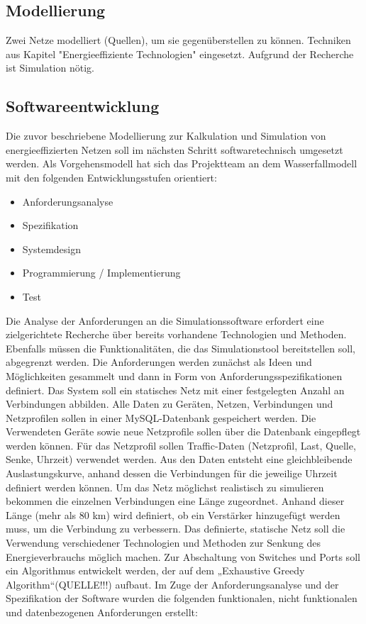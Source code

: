 \documentclass[12pt,titlepage]{article}
\begin{document}
\subsection{Modellierung}
Zwei Netze modelliert (Quellen), um sie gegenüberstellen zu können. Techniken aus Kapitel "Energieeffiziente Technologien" eingesetzt.
Aufgrund der Recherche ist Simulation nötig.

\subsection{Softwareentwicklung}
Die zuvor beschriebene Modellierung zur Kalkulation und Simulation von energieeffizierten Netzen soll im nächsten Schritt softwaretechnisch umgesetzt werden. Als Vorgehensmodell hat sich das Projektteam an dem Wasserfallmodell mit den folgenden Entwicklungsstufen orientiert:
\begin{itemize}
\item Anforderungsanalyse
\item Spezifikation
\item Systemdesign
\item Programmierung / Implementierung
\item Test
\end{itemize}
Die Analyse der Anforderungen an die Simulationssoftware erfordert eine zielgerichtete Recherche über bereits vorhandene Technologien und Methoden. Ebenfalls müssen die Funktionalitäten, die das Simulationstool bereitstellen soll, abgegrenzt werden. Die Anforderungen werden zunächst als Ideen und Möglichkeiten gesammelt und dann in Form von Anforderungsspezifikationen definiert. 
Das System soll ein statisches Netz mit einer festgelegten Anzahl an Verbindungen abbilden. Alle Daten zu Geräten, Netzen, Verbindungen und Netzprofilen sollen in einer MySQL-Datenbank gespeichert werden. Die Verwendeten Geräte sowie neue Netzprofile sollen über die Datenbank eingepflegt werden können. Für das Netzprofil sollen Traffic-Daten (Netzprofil, Last, Quelle, Senke, Uhrzeit) verwendet werden. Aus den Daten entsteht eine gleichbleibende Auslastungskurve, anhand dessen die Verbindungen für die jeweilige Uhrzeit definiert werden können. Um das Netz möglichst realistisch zu simulieren bekommen die einzelnen Verbindungen eine Länge zugeordnet. Anhand dieser Länge (mehr als 80 km) wird definiert, ob ein Verstärker hinzugefügt werden muss, um die Verbindung zu verbessern. Das definierte, statische Netz soll die Verwendung verschiedener Technologien und Methoden zur Senkung des Energieverbrauchs möglich machen. Zur Abschaltung von Switches und Ports soll ein Algorithmus entwickelt werden, der auf dem „Exhaustive Greedy Algorithm“(QUELLE!!!) aufbaut.
Im Zuge der Anforderungsanalyse und der Spezifikation der Software wurden die folgenden funktionalen, nicht funktionalen und datenbezogenen Anforderungen erstellt:
\end{document}
